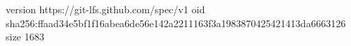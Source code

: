 version https://git-lfs.github.com/spec/v1
oid sha256:ffaad34e5bf1f16abea6de56e142a2211163f3a1983870425421413da6663126
size 1683
